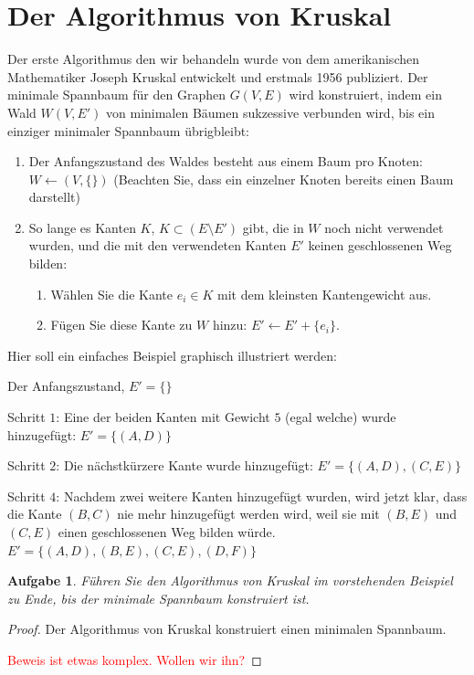 \documentclass[12pt,a4paper]{report}
\theoremstyle{break}
\newtheorem{exercise}{Aufgabe}[section]
\theoremstyle{plain}
\newtheorem{proof}{Satz}[section]
\newcommand{\algostep}[2]{\parbox{4cm}{\scalebox{0.5}{\texttt{[image: \#1]}}}
  \hfill
  \parbox{7cm}{#2}
}
\begin{document}
\section{Der Algorithmus von Kruskal}

Der erste Algorithmus den wir behandeln wurde von dem
amerikanischen Mathematiker Joseph Kruskal entwickelt und erstmals
1956 publiziert. Der minimale Spannbaum f\"{u}r den Graphen $G(V,E)$
wird konstruiert, indem ein Wald $W(V, E')$ von minimalen B\"{a}umen
sukzessive verbunden wird, bis ein einziger minimaler Spannbaum
\"ubrigbleibt:

\begin{enumerate}
\item Der Anfangszustand des Waldes besteht aus einem Baum pro Knoten:
  $W \gets (V, \{\})$ (Beachten Sie, dass ein
  einzelner Knoten bereits einen Baum darstellt)
\item So lange es Kanten $K$, $K\subset (E\setminus{E'})$ gibt, die in $W$ noch nicht
  verwendet wurden, und die mit den verwendeten Kanten $E'$ keinen
  geschlossenen Weg bilden:
\begin{enumerate}
\item W\"{a}hlen Sie die Kante $e_i\in K$ mit dem kleinsten
  Kantengewicht aus.
\item F\"{u}gen Sie diese Kante zu $W$ hinzu: $E' \gets E'+\{e_i\}$.
\end{enumerate}
\end{enumerate}

\newpage
Hier soll ein einfaches Beispiel graphisch illustriert werden:

\algostep{Demo.pdf}{Der Anfangszustand, $E' = \{\}$}
\algostep{DemoKruskal1.pdf}{Schritt $1$: Eine der beiden Kanten mit Gewicht $5$
  (egal welche) wurde hinzugef\"ugt: $E' = \{(A,D)\}$}
\algostep{DemoKruskal2.pdf}{Schritt $2$: Die n\"{a}chstk\"{u}rzere
  Kante wurde hinzugef\"ugt: $E' = \{(A,D), (C,E)\}$}
\algostep{DemoKruskal3.pdf}{Schritt $4$: Nachdem zwei weitere Kanten
  hinzugef\"ugt wurden, wird jetzt klar, dass die Kante $(B,C)$ nie
  mehr hinzugef\"ugt werden wird, weil sie mit $(B,E)$ und $(C,E)$
  einen geschlossenen Weg bilden w\"{u}rde. $E' = \{(A,D), (B,E),
  (C,E), (D,F)\}$}

\newpage
\begin{exercise}
F\"{u}hren Sie den Algorithmus von Kruskal im vorstehenden Beispiel zu
Ende, bis der minimale Spannbaum konstruiert ist.
\end{exercise}

\begin{proof}\label{kruskproof}Der Algorithmus von Kruskal konstruiert
  einen minimalen Spannbaum.

\textcolor{red}{Beweis ist etwas komplex. Wollen wir ihn?}
\end{proof}
\end{document}
